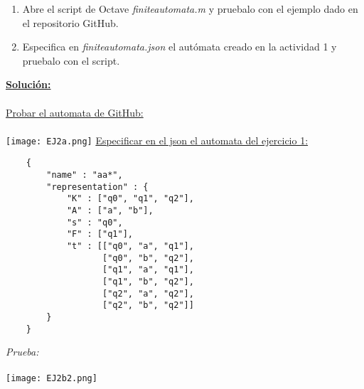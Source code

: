 \documentclass{article}
\begin{document}
\begin{enumerate}[label=\alph{enumi})]
    \item Abre el script de Octave \textit{finiteautomata.m} y pruebalo con el ejemplo dado en el repositorio GitHub.
    \item Especifica en \textit{finiteautomata.json} el autómata creado en la actividad 1 y pruebalo con el script.
\end{enumerate}

\underline{\textbf{Solución:}}
\\
\\ \underline{Probar el automata de GitHub:}
\\
\\ \texttt{[image: EJ2a.png]}
\newpage
\underline{Especificar en el json el automata del ejercicio 1:}
\begin{verbatim}
    {
        "name" : "aa*",
        "representation" : {
            "K" : ["q0", "q1", "q2"],
            "A" : ["a", "b"],
            "s" : "q0",
            "F" : ["q1"],
            "t" : [["q0", "a", "q1"],
                   ["q0", "b", "q2"],
                   ["q1", "a", "q1"],
                   ["q1", "b", "q2"],
                   ["q2", "a", "q2"],
                   ["q2", "b", "q2"]]
        }
    }
\end{verbatim}

\textit{Prueba:}
\\
\\ \texttt{[image: EJ2b2.png]}
\end{document}
